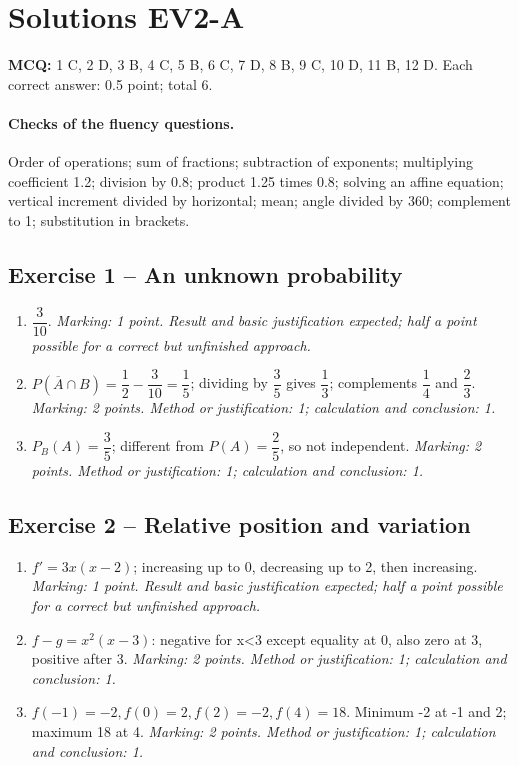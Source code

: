 \clearpage\section*{Solutions EV2-A}\label{EV2-A-CORR}
\textbf{MCQ:} 1 C, 2 D, 3 B, 4 C, 5 B, 6 C, 7 D, 8 B, 9 C, 10 D, 11 B, 12 D. Each correct answer: 0.5 point; total 6.
\paragraph{Checks of the fluency questions.} Order of operations; sum of fractions; subtraction of exponents; multiplying coefficient 1.2; division by 0.8; product 1.25 times 0.8; solving an affine equation; vertical increment divided by horizontal; mean; angle divided by 360; complement to 1; substitution in brackets.
\subsection*{Exercise 1 -- An unknown probability}
\begin{enumerate}
\item $\dfrac{3}{10}$. \textit{Marking: 1 point. Result and basic justification expected; half a point possible for a correct but unfinished approach.}
\item $P(\overline A\cap B)=\dfrac{1}{2}-\dfrac{3}{10}=\dfrac{1}{5}$; dividing by $\dfrac{3}{5}$ gives $\dfrac{1}{3}$; complements $\dfrac{1}{4}$ and $\dfrac{2}{3}$. \textit{Marking: 2 points. Method or justification: 1; calculation and conclusion: 1.}
\item $P_B(A)=\dfrac{3}{5}$; different from $P(A)=\dfrac{2}{5}$, so not independent. \textit{Marking: 2 points. Method or justification: 1; calculation and conclusion: 1.}
\end{enumerate}
\subsection*{Exercise 2 -- Relative position and variation}
\begin{enumerate}
\item $f\prime=3x(x-2)$; increasing up to 0, decreasing up to 2, then increasing. \textit{Marking: 1 point. Result and basic justification expected; half a point possible for a correct but unfinished approach.}
\item $f-g=x^2(x-3)$: negative for x<3 except equality at 0, also zero at 3, positive after 3. \textit{Marking: 2 points. Method or justification: 1; calculation and conclusion: 1.}
\item $f(-1)=-2,f(0)=2,f(2)=-2,f(4)=18$. Minimum -2 at -1 and 2; maximum 18 at 4. \textit{Marking: 2 points. Method or justification: 1; calculation and conclusion: 1.}
\end{enumerate}
